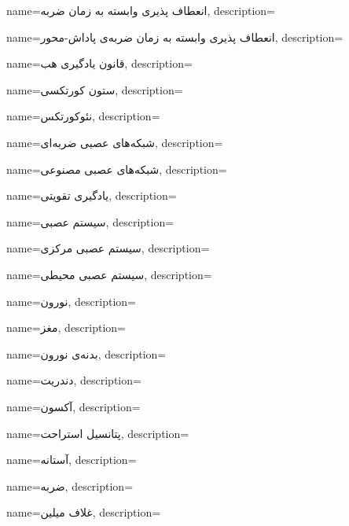 {
	name={انعطاف پذیری وابسته به زمان ضربه},
	description=\hfill{}
}

{
	name={انعطاف پذیری وابسته به زمان ضربه‌ی پاداش-محور},
	description=\hfill{}
}

{
    name={قانون یادگیری هب},
    description=\hfill{}
}

{
name={ستون‌ کورتکسی},
description=\hfill{}
}

{
name={نئوکورتکس},
description=\hfill{}
}

{
	name={شبکه‌های عصبی ضربه‌ای},
	description=\hfill{}
}

{
	name={شبکه‌های عصبی مصنوعی},
	description=\hfill{}
}

{
	name={یادگیری تقویتی},
	description=\hfill{}
}

{
	name={سیستم عصبی},
	description=\hfill{}
}

{
	name={سیستم عصبی مرکزی},
	description=\hfill{}
}

{
	name={سیستم عصبی محیطی},
	description=\hfill{}
}

{
	name={نورون},
	description=\hfill{}
}

{
	name={مغز},
	description=\hfill{}
}

{
	name={بدنه‌ی نورون},
	description=\hfill{}
}

{
	name={دندریت},
	description=\hfill{}
}

{
	name={آکسون},
	description=\hfill{}
}

{
	name={پتانسیل استراحت},
	description=\hfill{}
}

{
	name={آستانه},
	description=\hfill{}
}

{
	name={ضربه},
	description=\hfill{}
}

{
	name={غلاف میلین},
	description=\hfill{}
}

